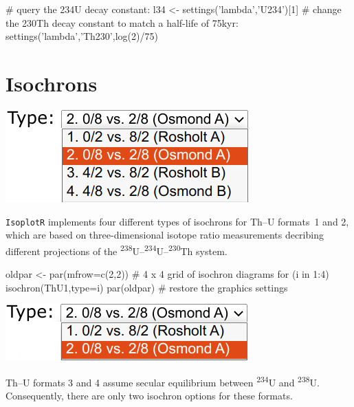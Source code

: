 \begin{refsection}
\begin{script}
# query the 234U decay constant:
l34 <- settings('lambda','U234')[1]
# change the 230Th decay constant to match a half-life of 75kyr:
settings('lambda','Th230',log(2)/75)
\end{script}

\section{Isochrons}\label{sec:ThUisochron-R}

\noindent\begin{minipage}[t]{.3\linewidth}
\strut\vspace*{-\baselineskip}\newline
\includegraphics[width=\linewidth]{../figures/ThUisochron12.png}
\end{minipage}
\begin{minipage}[t]{.7\linewidth}
  \texttt{IsoplotR} implements four different types of isochrons for
  Th--U formats~1 and 2, which are based on three-dimensional isotope
  ratio measurements decribing different projections of the
  \textsuperscript{238}U--\textsuperscript{234}U--\textsuperscript{230}Th
  system.
\end{minipage}

\begin{script}
oldpar <- par(mfrow=c(2,2)) # 4 x 4 grid of isochron diagrams
for (i in 1:4){ isochron(ThU1,type=i) }
par(oldpar) # restore the graphics settings
\end{script}

\noindent\begin{minipage}[t]{.3\linewidth}
\strut\vspace*{-\baselineskip}\newline
\includegraphics[width=\linewidth]{../figures/ThUisochron34.png}
\end{minipage}
\begin{minipage}[t]{.7\linewidth}
  Th--U formats 3 and 4 assume secular equilibrium between
  \textsuperscript{234}U and \textsuperscript{238}U. Consequently,
  there are only two isochron options for these formats.
\end{minipage}


\end{refsection}
